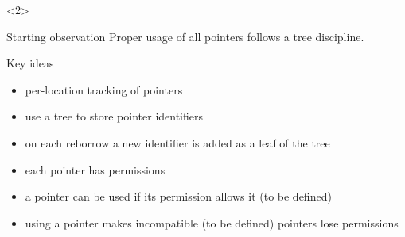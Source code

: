 \begin{frame}[t]
    \begin{onlyenv}<2>
        \begin{block}{Starting observation}
            Proper usage of {\color{red}all pointers} follows a {\color{red}tree} discipline.
        \end{block}
        \begin{block}{Key ideas}
            \begin{itemize}
                \item per-location tracking of pointers
                \item use a {\color{red}tree} to store pointer identifiers
                \item on each reborrow a new identifier is {\color{red}added as a leaf of the tree}
                \item {\color{red}each pointer has permissions}
                \item a pointer can be used {\color{red}if its permission allows it (to be defined)}
                \item using a pointer {\color{red}makes incompatible (to be defined) pointers lose permissions}
            \end{itemize}
        \end{block}
    \end{onlyenv}
\end{frame}

